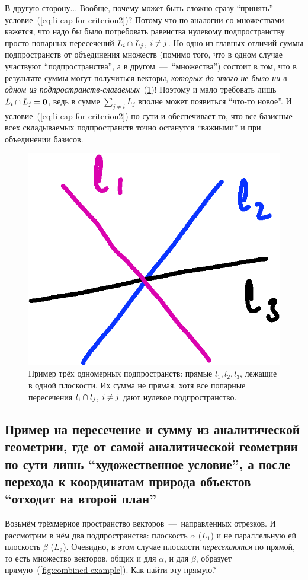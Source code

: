 \documentclass[a4paper,12pt]{article}
\begin{document}
  В другую сторону...
  Вообще, почему может быть сложно сразу ``принять'' условие~(\ref{eq:li-cap-for-criterion2})?
  Потому что по аналогии со множествами кажется, что надо бы было потребовать равенства нулевому подпространству просто попарных пересечений $L_i \hm\cap L_j$, $i \hm{\not=} j$.
  Но одно из главных отличий суммы подпространств от объединения множеств (помимо того, что в одном случае участвуют ``подпространства'', а в другом~---~``множества'') состоит в том, что в результате суммы могут получиться векторы, \emph{которых до этого не было ни в одном из подпространств-слагаемых}~(\ref{fig:indirect-sum-example})!
  Поэтому и мало требовать лишь $L_i \hm\cap L_j \hm= \bds 0$, ведь в сумме $\sum_{j \not= i} L_j$ вполне может появиться ``что-то новое''.
  И условие~(\ref{eq:li-cap-for-criterion2}) по сути и обеспечивает то, что все базисные всех складываемых подпространств точно останутся ``важными'' и при объединении базисов.
  
  \begin{figure}[h]
    \centering
  
    \includegraphics[width=0.35\columnwidth]{indirect-sum-example}
  
    \caption{Пример трёх одномерных подпространств: прямые $l_1, l_2, l_3$, лежащие в одной плоскости. Их сумма не прямая, хотя все попарные пересечения $l_i \hm\cap l_j$, $i \hm{\not=} j$ дают нулевое подпространство.}
    \label{fig:indirect-sum-example}
  \end{figure}
  
  
  \subsection{Пример на пересечение и сумму из аналитической геометрии, где от самой аналитической геометрии по сути лишь ``художественное условие'', а после перехода к координатам природа объектов ``отходит на второй план''}
  \label{sec:example-with-geome-vectors}
  
  Возьмём трёхмерное пространство векторов~---~направленных отрезков.
  И рассмотрим в нём два подпространства: плоскость $\alpha$ ($L_1$) и не параллельную ей плоскость $\beta$ ($L_2$).
  Очевидно, в этом случае плоскости \emph{пересекаются} по прямой, то есть множество векторов, общих и для $\alpha$, и для $\beta$, образует прямую~(\ref{fig:combined-example}).
  Как найти эту прямую?
  
\end{document}
